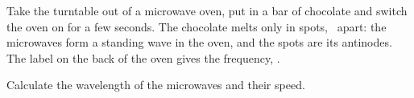 Take the turntable out of a microwave oven, put in a bar of chocolate and switch the oven on for a few seconds. The chocolate melts only in spots, \dO\ apart: the microwaves form a standing wave in the oven, and the spots are its antinodes. The label on the back of the oven gives the frequency, \fO.

Calculate the wavelength of the microwaves and their speed.
